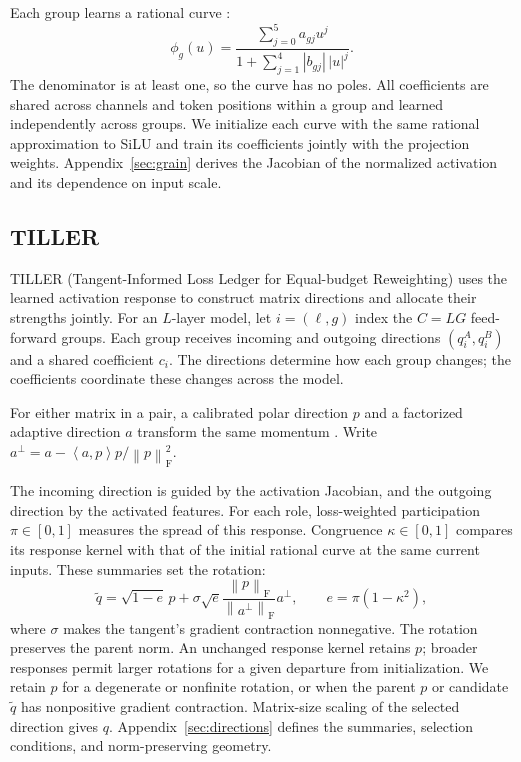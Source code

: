 \documentclass{article}
\newcommand{\frob}[1]{\left\lVert #1\right\rVert_{\mathrm F}}
\newcommand{\inner}[2]{\left\langle #1,#2\right\rangle}
\begin{document}
Each group learns a rational curve \citep{molina2020pade,yang2025kat}:
\begin{equation}
 \phi_g(u)=\frac{\sum_{j=0}^{5}a_{gj}u^j}
 {1+\sum_{j=1}^{4}|b_{gj}|\,|u|^j}.
 \label{eq:overview-rational}
\end{equation}
The denominator is at least one, so the curve has no poles.
All coefficients are shared across channels and token positions
within a group and learned independently across groups. We initialize
each curve with the same rational approximation to SiLU and train
its coefficients jointly with the projection weights.
Appendix~\ref{sec:grain} derives the Jacobian of the normalized
activation and its dependence on input scale.

\subsection{TILLER}

TILLER (Tangent-Informed Loss Ledger for Equal-budget Reweighting)
uses the learned activation response to construct matrix directions and
allocate their strengths jointly. For an $L$-layer model, let
$i=(\ell,g)$ index the $C=LG$ feed-forward groups. Each group receives
incoming and outgoing directions $(q_i^A,q_i^B)$ and a shared coefficient
$c_i$. The directions determine how each group changes; the coefficients
coordinate these changes across the model.

For either matrix in a pair, a calibrated polar direction $p$ and a
factorized adaptive direction $a$ transform the same momentum
\citep{jordan2024muon,liu2025muon,shazeer2018adafactor}. Write
$a^\perp=a-\inner{a}{p}p/\frob p^2$.

The incoming direction is guided by the activation Jacobian,
and the outgoing direction by the activated features.
For each role, loss-weighted participation $\pi\in[0,1]$ measures
the spread of this response. Congruence $\kappa\in[0,1]$ compares
its response kernel with that of the initial rational curve
at the same current inputs. These summaries set the rotation:
\begin{equation}
 \widetilde q=\sqrt{1-e}\,p+
 \sigma\sqrt e\frac{\frob p}{\frob{a^\perp}}a^\perp,
 \qquad e=\pi(1-\kappa^2),
 \label{eq:overview-rotation}
\end{equation}
where $\sigma$ makes the tangent's gradient contraction nonnegative.
The rotation preserves the parent norm.
An unchanged response kernel retains $p$; broader responses permit
larger rotations for a given departure from initialization.
We retain $p$ for a degenerate or nonfinite rotation, or when the
parent $p$ or candidate $\widetilde q$ has nonpositive gradient
contraction. Matrix-size scaling of the selected direction gives $q$.
Appendix~\ref{sec:directions} defines the summaries, selection
conditions, and norm-preserving geometry.
\end{document}
